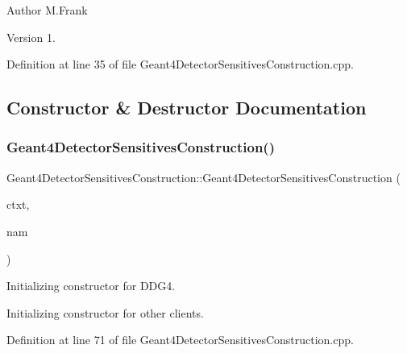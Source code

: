 \begin{DoxyAuthor}{Author}
M.\+Frank 
\end{DoxyAuthor}
\begin{DoxyVersion}{Version}
1. 
\end{DoxyVersion}


Definition at line 35 of file Geant4\+Detector\+Sensitives\+Construction.\+cpp.



\subsection{Constructor \& Destructor Documentation}
\hypertarget{class_d_d4hep_1_1_simulation_1_1_geant4_detector_sensitives_construction_a7ddfbbc0ba06d771e339d6a706835894}{}\label{class_d_d4hep_1_1_simulation_1_1_geant4_detector_sensitives_construction_a7ddfbbc0ba06d771e339d6a706835894} 
\subsubsection{\texorpdfstring{Geant4\+Detector\+Sensitives\+Construction()}{Geant4DetectorSensitivesConstruction()}}
{\footnotesize\ttfamily Geant4\+Detector\+Sensitives\+Construction\+::\+Geant4\+Detector\+Sensitives\+Construction (\begin{DoxyParamCaption}\item[{\hyperlink{class_d_d4hep_1_1_simulation_1_1_geant4_context}{Geant4\+Context} $\ast$}]{ctxt,  }\item[{const std\+::string \&}]{nam }\end{DoxyParamCaption})}



Initializing constructor for D\+D\+G4. 

Initializing constructor for other clients. 

Definition at line 71 of file Geant4\+Detector\+Sensitives\+Construction.\+cpp.

\hypertarget{class_d_d4hep_1_1_simulation_1_1_geant4_detector_sensitives_construction_a3013821bbc1d900a35f0a4e26a1956b6}{}\label{class_d_d4hep_1_1_simulation_1_1_geant4_detector_sensitives_construction_a3013821bbc1d900a35f0a4e26a1956b6} 
